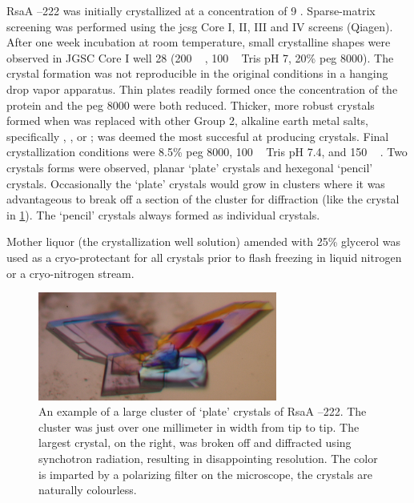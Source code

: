  RsaA  --222 was initially crystallized at a concentration of 9 \mgperml. Sparse-matrix screening was performed using the \ac{jcsg} Core I, II, III and IV screens (Qiagen). 
After one week incubation at room temperature, small crystalline shapes were
observed in JGSC Core I well 28 (200 \si{\milli\molar}  , 100 \si{\milli\molar} Tris pH 7, 20\% \ac{peg}
8000). The crystal formation was  not reproducible in the original conditions in
a hanging drop vapor apparatus. Thin plates readily formed once the concentration
of the protein and the \ac{peg} 8000 were both reduced. Thicker, more robust crystals
formed when  was replaced with other Group 2, alkaline earth metal salts, specifically , , or ;  was
deemed the most succesful at producing crystals. Final crystallization
conditions were 8.5\% \ac{peg} 8000, 100 \si{\milli\molar} Tris pH 7.4, and 150 \si{\milli\molar} .
Two crystals forms were observed, planar `plate' crystals and hexegonal
`pencil' crystals. Occasionally the `plate' crystals would grow in clusters where it was advantageous to break off a section of the cluster for diffraction (like the crystal in \cref{fig:crystal-flower}). The `pencil' crystals always formed as individual crystals.

 Mother liquor (\ie the crystallization well solution) amended with 25\% glycerol was used as a cryo-protectant for all
crystals prior to flash freezing in liquid nitrogen or a cryo-nitrogen stream.

\begin{figure}[htb]
  	\begin{center}
   		\includegraphics[width=0.7\textwidth]{crystal_chapter/img/bigflowerxtal.jpg}
   	\end{center}
   	\caption[Example of a large cluster of `plate' RsaA --222 crystals]{An example of a large cluster of `plate' crystals of RsaA --222. The cluster was just over one millimeter in width from tip to tip. The largest crystal, on the right, was broken off and diffracted using synchotron radiation, resulting in disappointing resolution. The color is imparted by a polarizing filter on the microscope, the crystals are naturally colourless.}
   	\label{fig:crystal-flower}
\end{figure}

